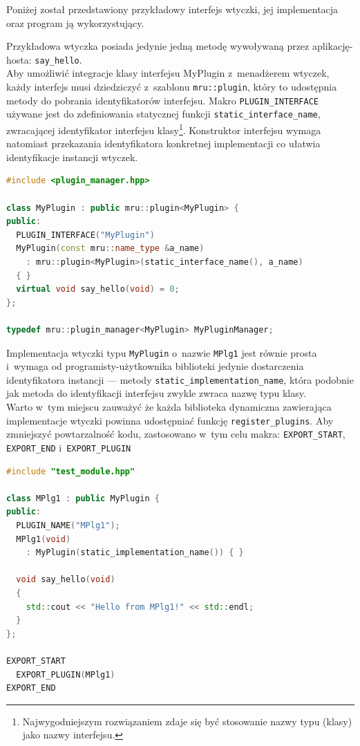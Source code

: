 \par
Poniżej został przedstawiony przykładowy interfejs wtyczki, jej implementacja oraz program ją wykorzystujący.

\par
Przykładowa wtyczka posiada jedynie jedną metodę wywoływaną przez aplikację-hosta: \texttt{say\_hello}.\\
Aby umożliwić integracje klasy interfejsu MyPlugin z~menadżerem wtyczek, każdy interfejs musi dziedziczyć z~szablonu \texttt{mru::plugin}, który to udostępnia metody do pobrania identyfikatorów interfejsu.
Makro \texttt{PLUGIN\_INTERFACE} używane jest do zdefiniowania statycznej funkcji \texttt{static\_interface\_name}, zwracającej identyfikator interfejsu klasy\footnote{Najwygodniejszym rozwiązaniem zdaje się być stosowanie nazwy typu (klasy) jako nazwy interfejsu.}.
Konstruktor interfejsu wymaga natomiast przekazania identyfikatora konkretnej implementacji co ułatwia identyfikacje instancji wtyczek.
\begin{lstlisting}[caption={ test\_module.hpp}, language=C++]
#include <plugin_manager.hpp>

class MyPlugin : public mru::plugin<MyPlugin> {
public:
  PLUGIN_INTERFACE("MyPlugin")
  MyPlugin(const mru::name_type &a_name)
    : mru::plugin<MyPlugin>(static_interface_name(), a_name)
  { }
  virtual void say_hello(void) = 0;
};

typedef mru::plugin_manager<MyPlugin> MyPluginManager;
\end{lstlisting}

\par
Implementacja wtyczki typu \texttt{MyPlugin} o~nazwie \texttt{MPlg1} jest równie prosta i~wymaga od programisty-użytkownika biblioteki jedynie dostarczenia identyfikatora instancji --- metody \texttt{static\_implementation\_name}, która podobnie jak metoda do identyfikacji interfejsu zwykle zwraca nazwę typu klasy.\\
Warto w~tym miejscu zauważyć że każda biblioteka dynamiczna zawierająca implementacje wtyczki powinna udostępniać funkcję \texttt{register\_plugins}. Aby zmniejszyć powtarzalność kodu, zastosowano w~tym celu makra: \texttt{EXPORT\_START}, \texttt{EXPORT\_END} i~\texttt{EXPORT\_PLUGIN}
\begin{lstlisting}[caption={ test\_module.cpp}, language=C++]
#include "test_module.hpp"

class MPlg1 : public MyPlugin { 
public:
  PLUGIN_NAME("MPlg1");
  MPlg1(void)
    : MyPlugin(static_implementation_name()) { } 

  void say_hello(void)
  {
    std::cout << "Hello from MPlg1!" << std::endl;
  }
};

EXPORT_START
  EXPORT_PLUGIN(MPlg1)
EXPORT_END

\end{lstlisting}

